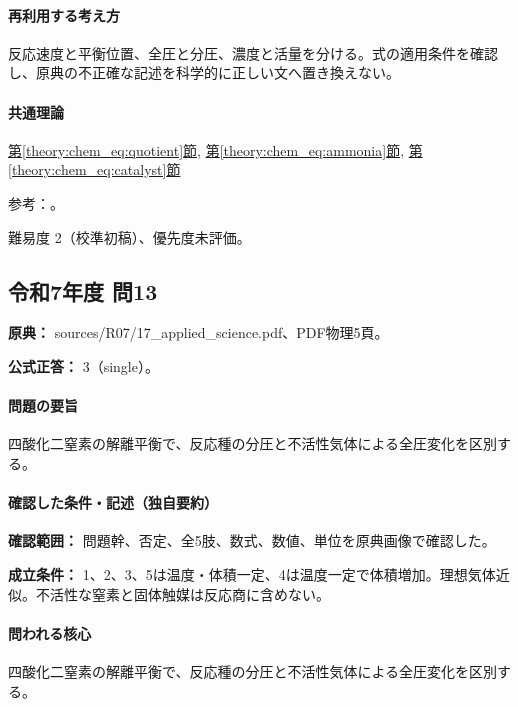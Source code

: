 \paragraph{再利用する考え方} 反応速度と平衡位置、全圧と分圧、濃度と活量を分ける。式の適用条件を確認し、原典の不正確な記述を科学的に正しい文へ置き換えない。

\paragraph{共通理論} \hyperref[theory:chem_eq:quotient]{第\ref*{theory:chem_eq:quotient}節}, \hyperref[theory:chem_eq:ammonia]{第\ref*{theory:chem_eq:ammonia}節}, \hyperref[theory:chem_eq:catalyst]{第\ref*{theory:chem_eq:catalyst}節}

\par 参考：\cite{iupac_greenbook2012}。

\par 難易度 2（校準初稿）、優先度未評価。

\subsection{令和7年度 問13}
\label{q:r07-reg-applied-13}

\noindent\textbf{原典：} sources/R07/17\_applied\_science.pdf、PDF物理5頁。

\textbf{公式正答：} 3（single）。

\paragraph{問題の要旨} 四酸化二窒素の解離平衡で、反応種の分圧と不活性気体による全圧変化を区別する。

\paragraph{確認した条件・記述（独自要約）}\mbox{}\par

\noindent\textbf{確認範囲：} 問題幹、否定、全5肢、数式、数値、単位を原典画像で確認した。\par

\noindent\textbf{成立条件：} 1、2、3、5は温度・体積一定、4は温度一定で体積増加。理想気体近似。不活性な窒素と固体触媒は反応商に含めない。\par

\paragraph{問われる核心} 四酸化二窒素の解離平衡で、反応種の分圧と不活性気体による全圧変化を区別する。


